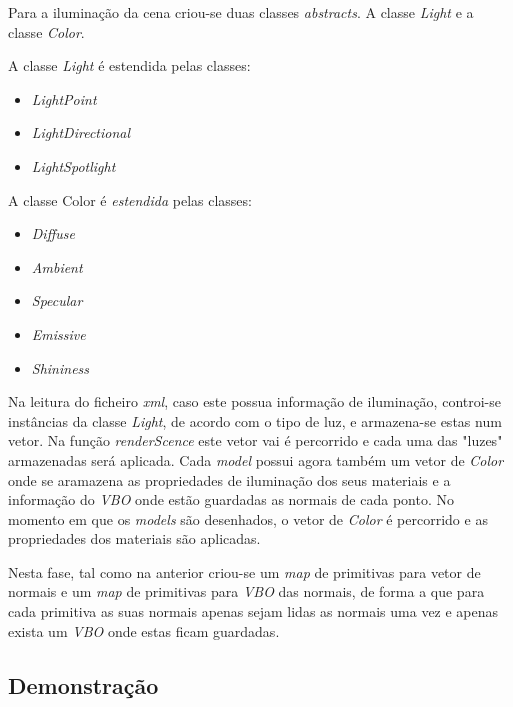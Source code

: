 \documentclass[11pt,a4paper]{report}
\begin{document}
Para a iluminação da cena criou-se duas classes \textit{abstracts}. A classe \textit{Light} e a classe \textit{Color}.

A classe \textit{Light} é estendida pelas classes:

\begin{itemize}
    \item \textit{LightPoint}
    \item \textit{LightDirectional}
    \item \textit{LightSpotlight} 
\end{itemize}
\newline

A classe Color é \textit{estendida} pelas classes:

\begin{itemize}
    \item \textit{Diffuse}
    \item \textit{Ambient}
    \item \textit{Specular}
    \item \textit{Emissive}
    \item \textit{Shininess}
\end{itemize}

Na leitura do ficheiro \textit{xml}, caso este possua informação de iluminação, controi-se instâncias da classe \textit{Light}, de acordo com o tipo de luz, e armazena-se estas num vetor. Na função \textit{renderScence} este vetor vai é percorrido e cada uma das "luzes" armazenadas será aplicada. 
Cada \textit{model} possui agora também um vetor de \textit{Color} onde se aramazena as propriedades de iluminação dos seus materiais e a informação do \textit{VBO} onde estão guardadas as normais de cada ponto. No momento em que os \textit{models} são desenhados, o vetor de \textit{Color} é percorrido e as propriedades dos materiais são aplicadas.
\par
Nesta fase, tal como na anterior criou-se um \textit{map} de primitivas para vetor de normais e um \textit{map} de primitivas para \textit{VBO} das normais, de forma a que para cada primitiva as suas normais apenas sejam lidas as normais uma vez e apenas exista um \textit{VBO} onde estas ficam guardadas. 
\subsection{Demonstração}
\end{document}

